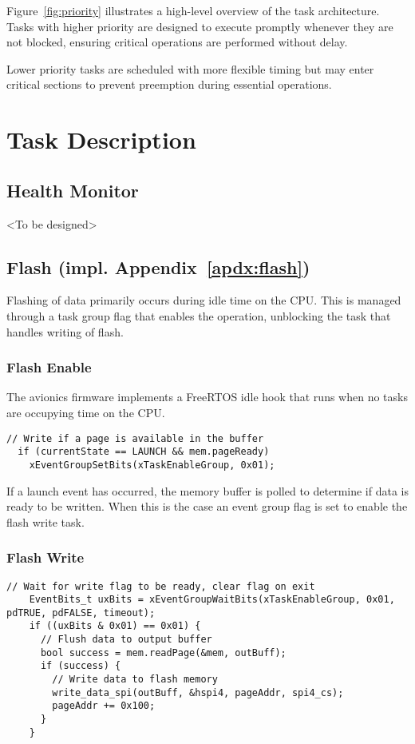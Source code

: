 Figure~\ref{fig:priority}  illustrates a high-level overview of the task architecture. Tasks with higher priority are designed to execute promptly whenever they are not blocked, ensuring critical operations are performed without delay. 

Lower priority tasks are scheduled with more flexible timing but may enter critical sections to prevent preemption during essential operations.

\section{Task Description}

\subsection{Health Monitor}
<To be designed>

\subsection{Flash \normalfont\small{(impl. Appendix~\ref{apdx:flash})}}
Flashing of data primarily occurs during idle time on the CPU. This is managed through a task group flag that enables the operation, unblocking the task that handles writing of flash.

\subsubsection{Flash Enable}
The avionics firmware implements a FreeRTOS idle hook that runs when no tasks are occupying time on the CPU. 

\begin{lstlisting}[caption={Flash idle logic}, captionpos=t]
  // Write if a page is available in the buffer
  if (currentState == LAUNCH && mem.pageReady)
    xEventGroupSetBits(xTaskEnableGroup, 0x01);
\end{lstlisting}

If a launch event has occurred, the memory buffer is polled to determine if data is ready to be written. When this is the case an event group flag is set to enable the flash write task.


\subsubsection{Flash Write}
\begin{lstlisting}[caption={Flash write logic}, captionpos=t]
    // Wait for write flag to be ready, clear flag on exit
    EventBits_t uxBits = xEventGroupWaitBits(xTaskEnableGroup, 0x01, pdTRUE, pdFALSE, timeout);
    if ((uxBits & 0x01) == 0x01) {
      // Flush data to output buffer
      bool success = mem.readPage(&mem, outBuff); 
      if (success) {
        // Write data to flash memory
        write_data_spi(outBuff, &hspi4, pageAddr, spi4_cs);
        pageAddr += 0x100;
      }
    }
\end{lstlisting}

